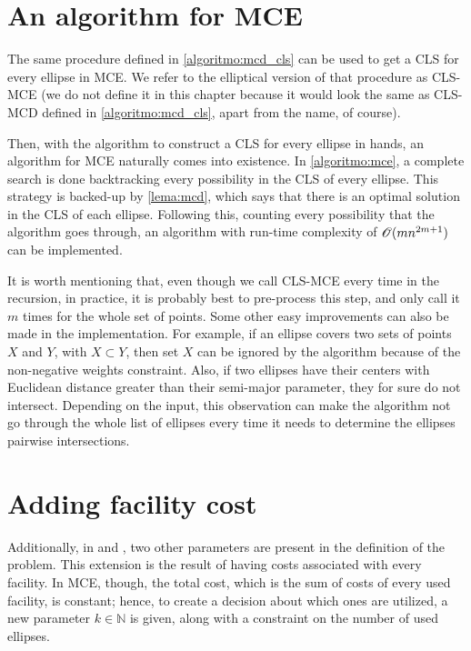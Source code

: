 \section{An algorithm for MCE}

The same procedure defined in \autoref{algoritmo:mcd_cls} can be used to get a CLS for every ellipse in MCE. We refer to the elliptical version of that procedure as CLS-MCE (we do not define it in this chapter because it would look the same as CLS-MCD defined in \autoref{algoritmo:mcd_cls}, apart from the name, of course). 

Then, with the algorithm to construct a CLS for every ellipse in hands, an algorithm for MCE naturally comes into existence. In \autoref{algoritmo:mce}, a complete search is done backtracking every possibility in the CLS of every ellipse. This strategy is backed-up by \autoref{lema:mcd}, which says that there is an optimal solution in the CLS of each ellipse. 
Following this, counting every possibility that the algorithm goes through, an algorithm with run-time complexity of $\mathscr{O}(mn^{2m + 1})$ can be implemented.

It is worth mentioning that, even though we call CLS-MCE every time in the recursion, in practice, it is probably best to pre-process this step, and only call it $m$ times for the whole set of points.
Some other easy improvements can also be made in the implementation. For example, if an ellipse covers two sets of points $X$ and $Y$, with $X \subset Y$, then set $X$ can be ignored by the algorithm because of the non-negative weights constraint. Also, if two ellipses have their centers with Euclidean distance greater than their semi-major parameter, they for sure do not intersect. Depending on the input, this observation can make the algorithm not go through the whole list of ellipses every time it needs to determine the ellipses pairwise intersections.

\section{Adding facility cost}

Additionally, in  and , two other parameters are present in the definition of the problem. This extension is the result of having costs associated with every facility.
In MCE, though, the total cost, which is the sum of costs of every used facility, is constant; hence, to create a decision about which ones are utilized, a new parameter $k\in\mathbb{N}$ is given, along with a constraint on the number of used ellipses.

